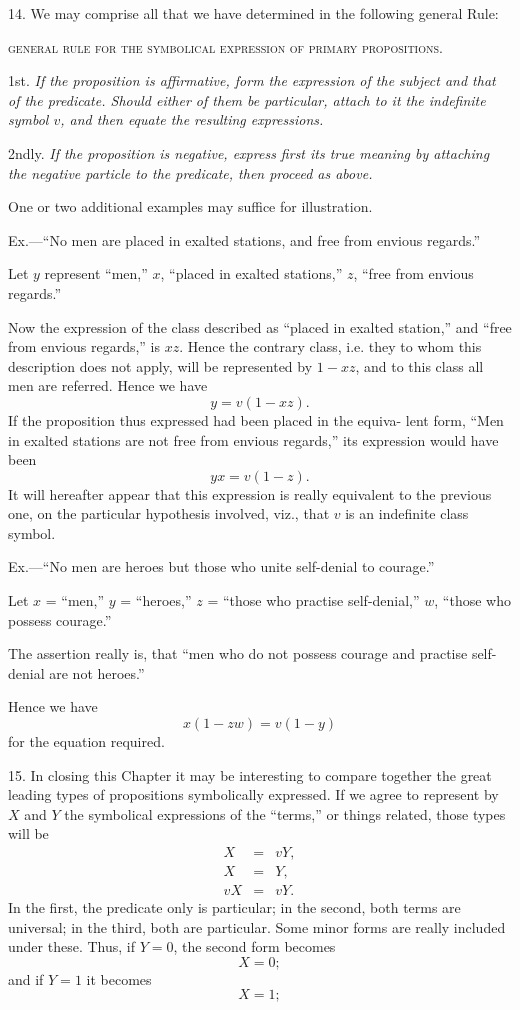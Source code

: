 \documentclass[oneside]{book}
\begin{document}
14. We may comprise all that we have determined in the
following general Rule:

\begin{center}
\textsc{general rule for the symbolical expression of primary propositions}.
\end{center}

1st. \textit{If the proposition is affirmative, form the expression of the
subject and that of the predicate. Should either of them be particular,
attach to it the indefinite symbol $v$, and then equate the resulting expressions.}

2ndly. \textit{If the proposition is negative, express first its true meaning
by attaching the negative particle to the predicate, then proceed as
above.}

One or two additional examples may suffice for illustration.

Ex.---``No men are placed in exalted stations, and free from
envious regards.''

Let $y$ represent ``men,'' $x$, ``placed in exalted stations,'' $z$,
``free from envious regards.''

Now the expression of the class described as ``placed in
exalted station,'' and ``free from envious regards,'' is $xz$. Hence
the contrary class, i.e. they to whom this description does not
apply, will be represented by $1 - xz$, and to this class all men
are referred. Hence we have
\[
y = v \left( 1 - xz \right).
\]
If the proposition thus expressed had been placed in the equiva-
lent form, ``Men in exalted stations are not free from envious
regards,'' its expression would have been
\[
yx = v \left( 1 - z \right).
\]
It will hereafter appear that this expression is really equivalent
to the previous one, on the particular hypothesis involved, viz.,
that $v$ is an indefinite class symbol.

Ex.---``No men are heroes but those who unite self-denial to
courage.''

Let $x$ = ``men,'' $y$ = ``heroes,'' $z$ = ``those who practise self-denial,''
$w$, ``those who possess courage.''

The assertion really is, that ``men who do not possess courage
and practise self-denial are not heroes.''

Hence we have
\[
x \left( 1 - zw \right) = v \left( 1 - y \right)
\]
for the equation required.

15. In closing this Chapter it may be interesting to compare
together the great leading types of propositions symbolically expressed.
If we agree to represent by $X$ and $Y$ the symbolical
expressions of the ``terms,'' or things related, those types will
be
\begin{eqnarray*}
X &=& vY, \\
X &=& Y, \\
vX &=& vY.
\end{eqnarray*}
In the first, the predicate only is particular; in the second, both
terms are universal; in the third, both are particular. Some minor
forms are really included under these. Thus, if $Y = 0$, the
second form becomes
\[
X=0;
\]
and if $Y = 1$ it becomes
\[
X = 1;
\]
\end{document}
